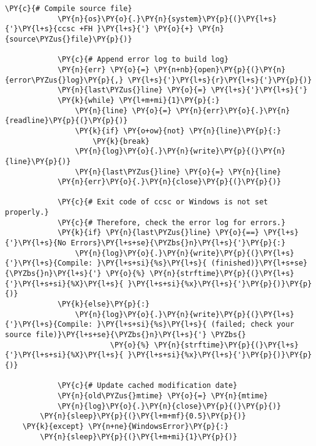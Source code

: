 \begin{Verbatim}[commandchars=\\\{\}]
            \PY{c}{# Compile source file}
            \PY{n}{os}\PY{o}{.}\PY{n}{system}\PY{p}{(}\PY{l+s}{'}\PY{l+s}{ccsc +FH }\PY{l+s}{'} \PY{o}{+} \PY{n}{source\PYZus{}file}\PY{p}{)}

            \PY{c}{# Append error log to build log}
            \PY{n}{err} \PY{o}{=} \PY{n+nb}{open}\PY{p}{(}\PY{n}{error\PYZus{}log}\PY{p}{,} \PY{l+s}{'}\PY{l+s}{r}\PY{l+s}{'}\PY{p}{)}
            \PY{n}{last\PYZus{}line} \PY{o}{=} \PY{l+s}{'}\PY{l+s}{'}
            \PY{k}{while} \PY{l+m+mi}{1}\PY{p}{:}
                \PY{n}{line} \PY{o}{=} \PY{n}{err}\PY{o}{.}\PY{n}{readline}\PY{p}{(}\PY{p}{)}
                \PY{k}{if} \PY{o+ow}{not} \PY{n}{line}\PY{p}{:}
                    \PY{k}{break}
                \PY{n}{log}\PY{o}{.}\PY{n}{write}\PY{p}{(}\PY{n}{line}\PY{p}{)}
                \PY{n}{last\PYZus{}line} \PY{o}{=} \PY{n}{line}
            \PY{n}{err}\PY{o}{.}\PY{n}{close}\PY{p}{(}\PY{p}{)}

            \PY{c}{# Exit code of ccsc or Windows is not set properly.}
            \PY{c}{# Therefore, check the error log for errors.}
            \PY{k}{if} \PY{n}{last\PYZus{}line} \PY{o}{==} \PY{l+s}{'}\PY{l+s}{No Errors}\PY{l+s+se}{\PYZbs{}n}\PY{l+s}{'}\PY{p}{:}
                \PY{n}{log}\PY{o}{.}\PY{n}{write}\PY{p}{(}\PY{l+s}{'}\PY{l+s}{Compile: }\PY{l+s+si}{%s}\PY{l+s}{ (finished)}\PY{l+s+se}{\PYZbs{}n}\PY{l+s}{'} \PY{o}{%} \PY{n}{strftime}\PY{p}{(}\PY{l+s}{'}\PY{l+s+si}{%X}\PY{l+s}{ }\PY{l+s+si}{%x}\PY{l+s}{'}\PY{p}{)}\PY{p}{)}
            \PY{k}{else}\PY{p}{:}
                \PY{n}{log}\PY{o}{.}\PY{n}{write}\PY{p}{(}\PY{l+s}{'}\PY{l+s}{Compile: }\PY{l+s+si}{%s}\PY{l+s}{ (failed; check your source file)}\PY{l+s+se}{\PYZbs{}n}\PY{l+s}{'} \PYZbs{}
                        \PY{o}{%} \PY{n}{strftime}\PY{p}{(}\PY{l+s}{'}\PY{l+s+si}{%X}\PY{l+s}{ }\PY{l+s+si}{%x}\PY{l+s}{'}\PY{p}{)}\PY{p}{)}

            \PY{c}{# Update cached modification date}
            \PY{n}{old\PYZus{}mtime} \PY{o}{=} \PY{n}{mtime}
            \PY{n}{log}\PY{o}{.}\PY{n}{close}\PY{p}{(}\PY{p}{)}
        \PY{n}{sleep}\PY{p}{(}\PY{l+m+mf}{0.5}\PY{p}{)}
    \PY{k}{except} \PY{n+ne}{WindowsError}\PY{p}{:}
        \PY{n}{sleep}\PY{p}{(}\PY{l+m+mi}{1}\PY{p}{)}
\end{Verbatim}
